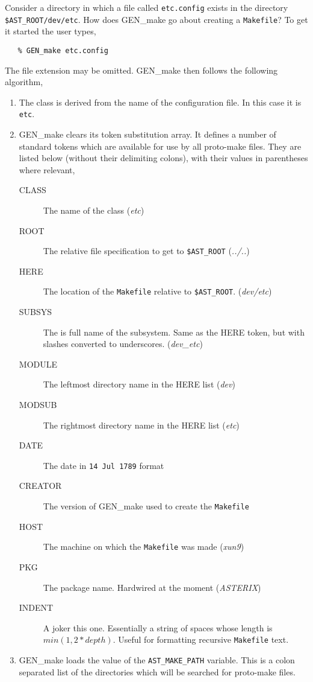 Consider a directory in which a file called \verb+etc.config+ exists in
the directory \verb+$AST_ROOT/dev/etc+. How
does GEN\_make go about creating a \verb+Makefile+? To get it started
the user types,
\begin{verbatim}
   % GEN_make etc.config
\end{verbatim}
The file extension may be omitted. GEN\_make then follows the following
algorithm,
\begin{enumerate}
\item The class is derived from the name of the configuration file. In this
  case it is \verb+etc+.
  
\item GEN\_make clears its token substitution array. It defines a number
  of standard tokens which are available for use by all proto-make files.
  They are listed below (without their delimiting colons), with their
  values in parentheses where relevant,
  \begin{description}
  \item[CLASS] The name of the class ({\em etc})
  \item[ROOT] The relative file specification to get to \verb+$AST_ROOT+ ({\em ../..})
  \item[HERE] The location of the \verb+Makefile+ relative to \verb+$AST_ROOT+. ({\em dev/etc})
  \item[SUBSYS] The is full name of
    the subsystem. Same as the HERE token, but with slashes converted to
    underscores. ({\em dev\_etc})
  \item[MODULE] The leftmost directory name in the HERE list ({\em dev})
  \item[MODSUB] The rightmost directory name in the HERE list ({\em etc})
  \item[DATE] The date in \verb+14 Jul 1789+ format
  \item[CREATOR] The version of GEN\_make used to create the \verb+Makefile+
  \item[HOST] The machine on which the \verb+Makefile+ was made ({\em xun9})
  \item[PKG] The package name. Hardwired at the moment ({\em ASTERIX})
  \item[INDENT] A joker this one. Essentially a string of spaces whose
    length is $min(1,2 * depth)$. Useful for formatting recursive
    \verb+Makefile+ text.
  \end{description}

\item GEN\_make loads the value of the \verb+AST_MAKE_PATH+ variable. This
  is a colon separated list of the directories which will be searched for
  proto-make files.


\end{enumerate}
